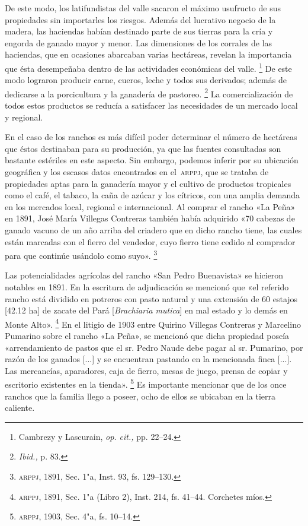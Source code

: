 \documentclass[14pt,twoside,final]{extbook} %
\let\oldfootnote\footnote
\renewcommand\footnote[1]{%
\oldfootnote{\hspace{1mm}#1}}
\begin{document}
De este modo, los latifundistas del valle sacaron el máximo usufructo de sus propiedades sin importarles los riesgos. Además del lucrativo negocio de la madera, las haciendas habían destinado parte de sus tierras para la cría y engorda de ganado mayor y menor. Las dimensiones de los corrales de las haciendas, que en ocasiones abarcaban varias hectáreas, revelan la importancia que ésta desempeñaba dentro de las actividades económicas del valle.\footnote{Cambrezy y Lascurain, \emph{op. cit.,} pp. 22--24.} De este modo lograron producir carne, cueros, leche y todos sus derivados; además de dedicarse a la porcicultura y la ganadería de pastoreo.\footnote{\emph{Ibid.,} p. 83.} La comercialización de todos estos productos se reducía a satisfacer las necesidades de un mercado local y regional.

En el caso de los ranchos es más difícil poder determinar el número de hectáreas que éstos destinaban para su producción, ya que las fuentes consultadas son bastante estériles en este aspecto. Sin embargo, podemos inferir por su ubicación geográfica y los escasos datos encontrados en el~\textsc{arppj}, que se trataba de propiedades aptas para la ganadería mayor y el cultivo de productos tropicales como el café, el tabaco, la caña de azúcar y los cítricos, con una amplia demanda en los mercados local, regional e internacional. Al comprar el rancho «La Peña» en 1891, José María Villegas Contreras también había adquirido «70 cabezas de ganado vacuno de un año arriba del criadero que en dicho rancho tiene, las cuales están marcadas con el fierro del vendedor, cuyo fierro tiene cedido al comprador para que continúe usándolo como suyo».\footnote{\textsc{arppj}, 1891, Sec. 1"a, Inst. 93, fs. 129--130.}

Las potencialidades agrícolas del rancho «San Pedro Buenavista» se hicieron notables en 1891. En la escritura de adjudicación se mencionó que «el referido rancho está dividido en potreros con pasto natural y una extensión de 60 estajos [42.12 ha] de zacate del Pará [\emph{Brachiaria mutica}] en mal estado y lo demás en Monte Alto».\footnote{\textsc{arppj}, 1891, Sec. 1"a (Libro 2), Inst. 214, fs. 41--44. Corchetes míos.} En el litigio de 1903 entre Quirino Villegas Contreras y Marcelino Pumarino sobre el rancho «La Peña», se mencionó que dicha propiedad poseía «arrendamiento de pastos que el sr. Pedro Naude debe pagar al sr. Pumarino, por razón de los ganados [...] y se encuentran pastando en la mencionada finca [...]. Las mercancías, aparadores, caja de fierro, mesas de juego, prensa de copiar y escritorio existentes en la tienda».\footnote{\textsc{arppj}, 1903, Sec. 4"a, fs. 10--14.} Es importante mencionar que de los once ranchos que la familia llego a poseer, ocho de ellos se ubicaban en la tierra caliente.
\end{document}
